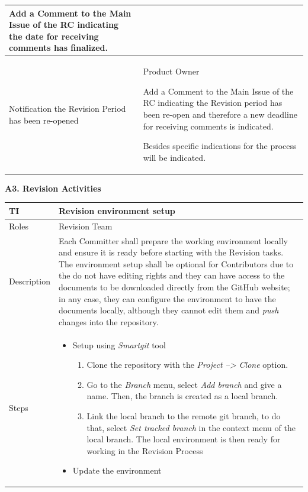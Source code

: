 \documentclass{template/openetcs_article}
\begin{document}
\begin{flushleft}
\begin{supertabular}{|m{3cm}|m{12cm}|}
Add a Comment to the Main Issue of the RC indicating the date for receiving comments has finalized.
\\\hline
Notification the Revision Period has been re-opened &
Product Owner


Add a Comment to the Main Issue of the RC indicating the Revision period has been re-open and therefore a new deadline for receiving comments is indicated.

Besides specific indications for the process will be indicated.
\\\hline
\end{supertabular}
\end{flushleft}

\textbf{A3. Revision Activities}

\begin{flushleft}
\tablefirsthead{}
\tablehead{}
\tabletail{}
\tablelasttail{}
\begin{supertabular}{|m{2cm}|m{13cm}|}
\hline
{}
TI & 
Revision environment setup
\\\hline
Roles &
Revision Team
\\\hline
Description &
Each Committer shall prepare the working environment locally and ensure it is ready before starting with the Revision tasks. The environment setup shall be optional for Contributors due to the do not have editing rights and they can have access to the documents to be downloaded directly from the GitHub website; in any case, they can configure the environment to have the documents locally, although they cannot edit them and {\it push} changes into the repository.
\\\hline
Steps &
\begin{itemize}
\item Setup using {\it Smartgit} tool
\begin{enumerate}
\item Clone the repository with the {\it Project --> Clone} option.
\item Go to the {\it Branch} menu, select {\it Add branch} and give a name. Then, the branch is created as a local branch.
\item Link the local branch to the remote git branch, to do that, select {\it Set tracked branch} in the context menu of the local branch. The local environment is then ready for working in the Revision Process
\end{enumerate}
\item Update the environment
\begin{itemize}

\end{itemize}
\end{itemize}
\end{supertabular}
\end{flushleft}
\end{document}
